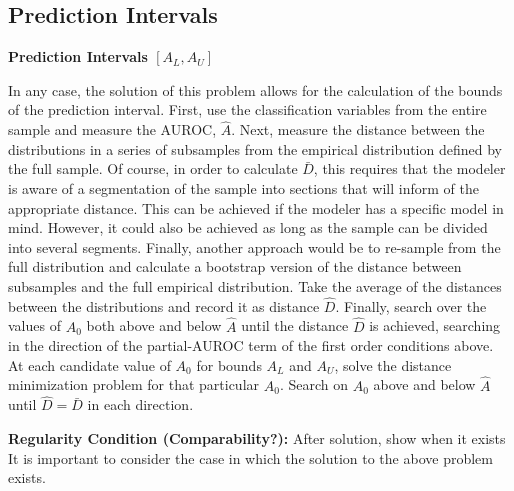 \subsection{Prediction Intervals} %

\textbf{Prediction Intervals $[A_L, A_U]$}



In any case, the solution of this problem allows for the calculation of the bounds of the prediction interval.
First, use the classification variables from the entire sample and measure the AUROC, $\hat{A}$.
%
Next, measure the distance between the distributions in a series of subsamples from the empirical distribution defined by the full sample.
%
Of course, in order to calculate $\bar{D}$,
%
this requires that the modeler is aware of a segmentation of the sample into sections that will inform of the appropriate distance.
This can be achieved if the modeler has a specific model in mind.
However, it could also be achieved as long as the sample can be divided into several segments.
Finally, another approach would be to re-sample from the full distribution and calculate a bootstrap version of the distance between subsamples and the full empirical distribution.
%
Take the average of the distances between the distributions and record it as distance $\hat{D}$.
%
Finally, search over the values of $A_0$ both above and below $\hat{A}$ until the distance $\hat{D}$ is achieved, searching in the direction of the partial-AUROC term of the first order conditions above.
At each candidate value of $A_0$ for bounds $A_L$ and $A_U$, solve the distance minimization problem for that particular $A_0$.
Search on $A_0$ above and below $\hat{A}$ until $\hat{D} = \bar{D}$ in each direction.


\textbf{Regularity Condition (Comparability?):}
{\Large After solution, show when it exists}
It is important to consider the case in which the solution to the above problem exists.

